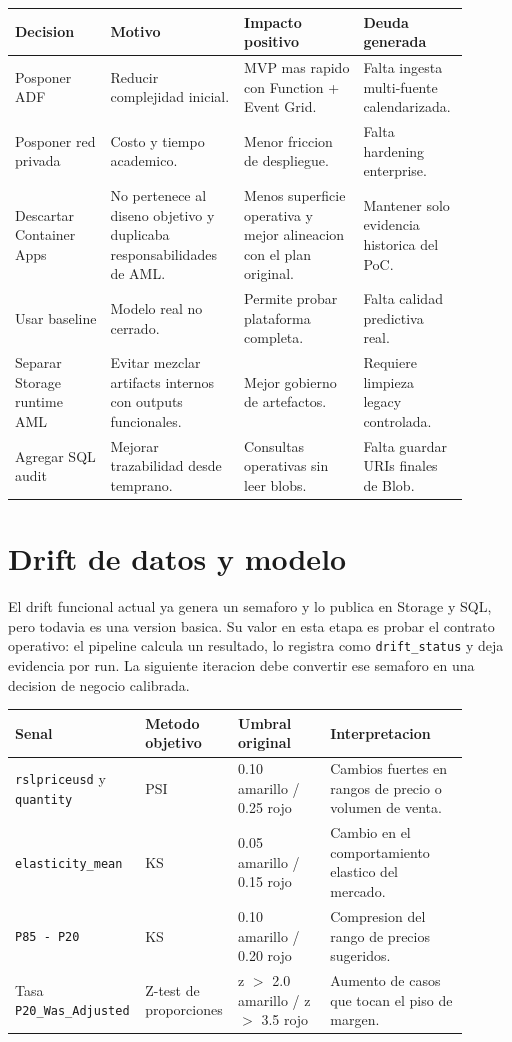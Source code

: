 \documentclass[11pt,letterpaper]{article}
\newcommand{\code}[1]{\texttt{\small #1}}
\begin{document}
\begin{longtable}{p{0.20\linewidth}p{0.28\linewidth}p{0.25\linewidth}p{0.17\linewidth}}
\toprule
\textbf{Decision} & \textbf{Motivo} & \textbf{Impacto positivo} & \textbf{Deuda generada}\\
\midrule
\endhead
Posponer ADF & Reducir complejidad inicial. & MVP mas rapido con Function + Event Grid. & Falta ingesta multi-fuente calendarizada.\\
Posponer red privada & Costo y tiempo academico. & Menor friccion de despliegue. & Falta hardening enterprise.\\
Descartar Container Apps & No pertenece al diseno objetivo y duplicaba responsabilidades de AML. & Menos superficie operativa y mejor alineacion con el plan original. & Mantener solo evidencia historica del PoC.\\
Usar baseline & Modelo real no cerrado. & Permite probar plataforma completa. & Falta calidad predictiva real.\\
Separar Storage runtime AML & Evitar mezclar artifacts internos con outputs funcionales. & Mejor gobierno de artefactos. & Requiere limpieza legacy controlada.\\
Agregar SQL audit & Mejorar trazabilidad desde temprano. & Consultas operativas sin leer blobs. & Falta guardar URIs finales de Blob.\\
\bottomrule
\end{longtable}

\section*{Drift de datos y modelo}

El drift funcional actual ya genera un semaforo y lo publica en Storage y SQL, pero todavia es una version basica. Su valor en esta etapa es probar el contrato operativo: el pipeline calcula un resultado, lo registra como \code{drift\_status} y deja evidencia por run. La siguiente iteracion debe convertir ese semaforo en una decision de negocio calibrada.

\begin{longtable}{p{0.22\linewidth}p{0.18\linewidth}p{0.20\linewidth}p{0.30\linewidth}}
\toprule
\textbf{Senal} & \textbf{Metodo objetivo} & \textbf{Umbral original} & \textbf{Interpretacion}\\
\midrule
\endhead
\code{rslpriceusd} y \code{quantity} & PSI & 0.10 amarillo / 0.25 rojo & Cambios fuertes en rangos de precio o volumen de venta.\\
\code{elasticity\_mean} & KS & 0.05 amarillo / 0.15 rojo & Cambio en el comportamiento elastico del mercado.\\
\code{P85 - P20} & KS & 0.10 amarillo / 0.20 rojo & Compresion del rango de precios sugeridos.\\
Tasa \code{P20\_Was\_Adjusted} & Z-test de proporciones & z $>$ 2.0 amarillo / z $>$ 3.5 rojo & Aumento de casos que tocan el piso de margen.\\
\bottomrule
\end{longtable}
\end{document}
